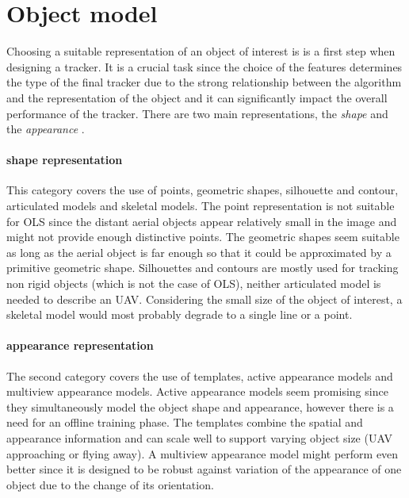 \section{Object model}

Choosing a suitable representation of an object of interest is is a first step when designing a tracker. It is a crucial task since the choice of the features determines the type of the final tracker due to the strong relationship between the algorithm and the representation of the object and it can significantly impact the overall performance of the tracker. There are two main representations, the \textit{shape} and the \textit{appearance} \cite{Yilmaz:2006:OTS:1177352.1177355}.

\paragraph{shape representation} 
This category covers the use of points, geometric shapes, silhouette and contour, articulated models and skeletal models. The point representation is not suitable for OLS since the distant aerial objects appear relatively small in the image and might not provide enough distinctive points. The geometric shapes seem suitable as long as the aerial object is far enough so that it could be approximated by a primitive geometric shape. Silhouettes and contours are mostly used for tracking non rigid objects (which is not the case of OLS), neither articulated model is needed to describe an UAV. Considering the small size of the object of interest, a skeletal model would most probably degrade to a single line or a point.

\paragraph{appearance representation} 
The second category covers the use of templates, active appearance models and multiview appearance models. Active appearance models seem promising since they simultaneously model the object shape and appearance, however there is a need for an offline training phase. The templates combine the spatial and appearance information and can scale well to support varying object size (UAV approaching or flying away). A multiview appearance model might perform even better since it is designed to be robust against variation of the appearance of one object due to the change of its orientation.

